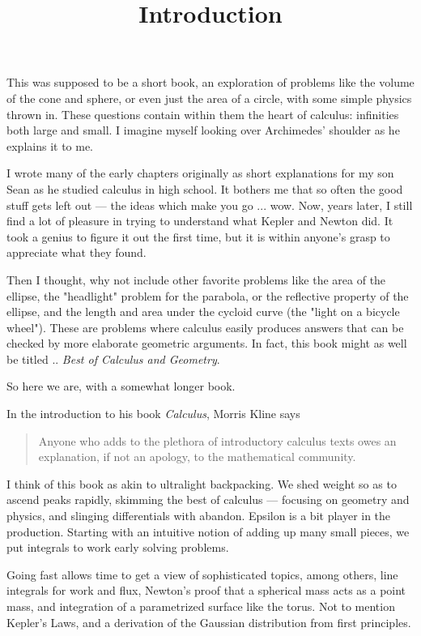 \documentclass[11pt, oneside]{article}
\title{Introduction}
\date{}
\begin{document}
\maketitle
\Large
This was supposed to be a short book, an exploration of problems like the volume of the cone and sphere, or even just the area of a circle, with some simple physics thrown in.  These questions contain within them the heart of calculus:  infinities both large and small.  I imagine myself looking over Archimedes' shoulder as he explains it to me.

I wrote many of the early chapters originally as short explanations for my son Sean as he studied calculus in high school.  It bothers me that so often the good stuff gets left out --- the ideas which make you go ... wow.  Now, years later, I still find a lot of pleasure in trying to understand what Kepler and Newton did.  It took a genius to figure it out the first time, but it is within anyone's grasp to appreciate what they found.

Then I thought, why not include other favorite problems like the area of the ellipse, the "headlight" problem for the parabola, or the reflective property of the ellipse, and the length and area under the cycloid curve (the "light on a bicycle wheel"). These are problems where calculus easily produces answers that can be checked by more elaborate geometric arguments.  In fact, this book might as well be titled .. \emph{Best of Calculus and Geometry}.

So here we are, with a somewhat longer book.

In the introduction to his book \emph{Calculus}, Morris Kline says
\begin{quote}Anyone who adds to the plethora of introductory calculus texts owes an explanation, if not an apology, to the mathematical community.\end{quote}

I think of this book as akin to ultralight backpacking.  We shed weight so as to ascend peaks rapidly, skimming the best of calculus --- focusing on geometry and physics, and slinging differentials with abandon.  Epsilon is a bit player in the production.  Starting with an intuitive notion of adding up many small pieces, we put integrals to work early solving problems.

Going fast allows time to get a view of sophisticated topics, among others, line integrals for work and flux, Newton's proof that a spherical mass acts as a point mass, and integration of a parametrized surface like the torus.  Not to mention Kepler's Laws, and a derivation of the Gaussian distribution from first principles.
\end{document}
